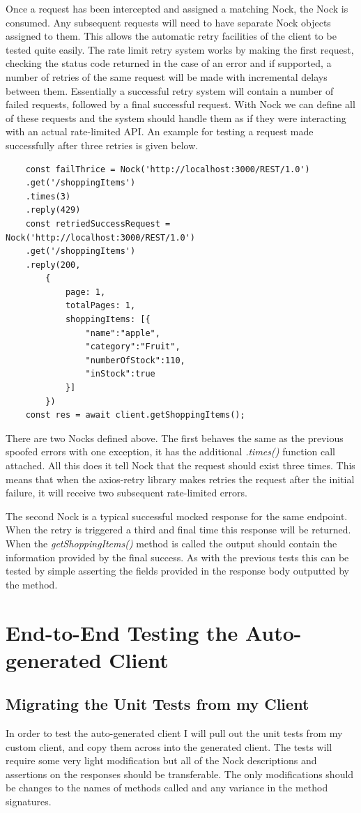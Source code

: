 Once a request has been intercepted and assigned a matching Nock, the Nock is consumed. Any subsequent requests will need to have separate Nock objects assigned to them. This allows the automatic retry facilities of the client to be tested quite easily. The rate limit retry system works by making the first request, checking the status code returned in the case of an error and if supported, a number of retries of the same request will be made with incremental delays between them. Essentially a successful retry system will contain a number of failed requests, followed by a final successful request. With Nock we can define all of these requests and the system should handle them as if they were interacting with an actual rate-limited API. An example for testing a request made successfully after three retries is given below.
\begin{verbatim}
    const failThrice = Nock('http://localhost:3000/REST/1.0')
    .get('/shoppingItems')
    .times(3)
    .reply(429)
    const retriedSuccessRequest = Nock('http://localhost:3000/REST/1.0')
    .get('/shoppingItems') 
    .reply(200,
        {
            page: 1,
            totalPages: 1,
            shoppingItems: [{
                "name":"apple",
                "category":"Fruit",
                "numberOfStock":110,
                "inStock":true
            }]
        })
    const res = await client.getShoppingItems();
\end{verbatim}
There are two Nocks defined above. The first behaves the same as the previous spoofed errors with one exception, it has the additional \textit{.times()} function call attached. All this does it tell Nock that the request should exist three times. This means that when the axios-retry library makes retries the request after the initial failure, it will receive two subsequent rate-limited errors. 

The second Nock is a typical successful mocked response for the same endpoint. When the retry is triggered a third and final time this response will be returned. When the \textit{getShoppingItems()} method is called the output should contain the information provided by the final success. As with the previous tests this can be tested by simple asserting the fields provided in the response body outputted by the method.
\section{End-to-End Testing the Auto-generated Client}
\subsection{Migrating the Unit Tests from my Client}
In order to test the auto-generated client I will pull out the unit tests from my custom client, and copy them across into the generated client. The tests will require some very light modification but all of the Nock descriptions and assertions on the responses should be transferable. The only modifications should be changes to the names of methods called and any variance in the method signatures.

